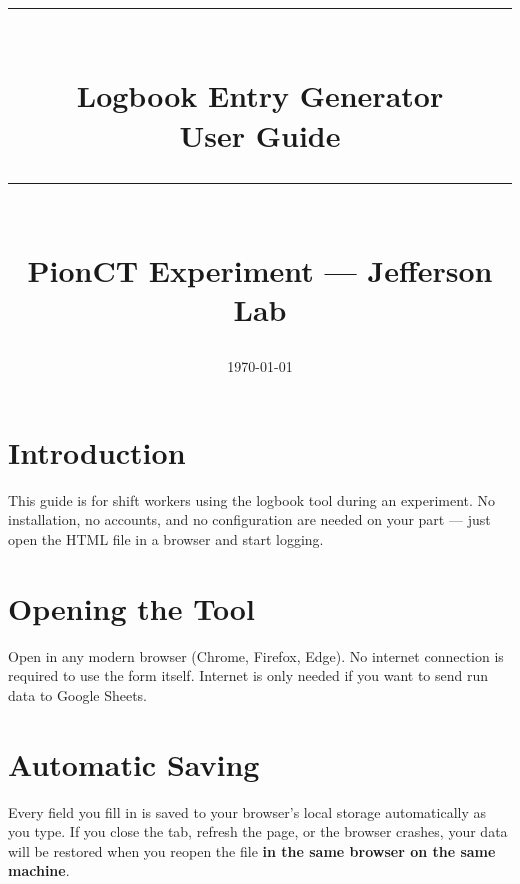 



\title{
    \vspace{2cm}
    {\color{pionorange}\rule{\linewidth}{2pt}}\\[0.6em]
    {\Huge\bfseries Logbook Entry Generator}\\[0.3em]
    {\Large User Guide}\\[0.4em]
    {\color{pionorange}\rule{\linewidth}{2pt}}\\[1em]
    {\large PionCT Experiment --- Jefferson Lab}
    \vspace{1cm}
}
\author{}
\date{\today}
\maketitle
\thispagestyle{empty}

\tableofcontents
\newpage

\chapter{Introduction}

This guide is for shift workers using the logbook tool during an experiment.
No installation, no accounts, and no configuration are needed on your part ---
just open the HTML file in a browser and start logging.

\chapter{Opening the Tool}

Open  in any modern browser (Chrome, Firefox,
Edge). No internet connection is required to use the form itself. Internet is
only needed if you want to send run data to Google Sheets.

\chapter{Automatic Saving}

Every field you fill in is saved to your browser's local storage automatically
as you type. If you close the tab, refresh the page, or the browser crashes,
your data will be restored when you reopen the file \textbf{in the same browser
on the same machine}.

